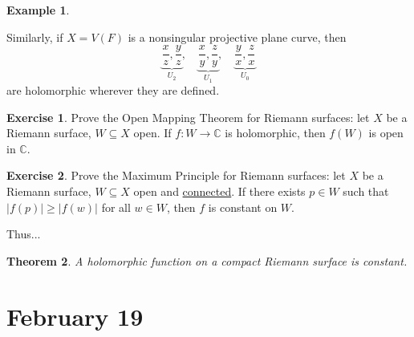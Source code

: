 \documentclass[12pt]{article}
\newcommand{\cx}{\mathbb{C}}
\newtheorem{theorem}{Theorem}[section]
\theoremstyle{definition}
\newtheorem{example}[theorem]{Example}
\newtheorem{exercise}{Exercise}
\theoremstyle{remark}
\begin{document}
\begin{example}
\begin{itemize}
        Similarly, if $X=V(F)$ is a nonsingular projective plane curve, then 
        \begin{equation}
            \underbrace{\frac{x}{z},\frac{y}{z}}_{U_2},\quad\underbrace{\frac{x}{y},\frac{z}{y}}_{U_1},\quad\underbrace{\frac{y}{x},\frac{z}{x}}_{U_0}
        \end{equation}
        are holomorphic wherever they are defined.
    \end{itemize}
\end{example}
\begin{exercise}
    Prove the Open Mapping Theorem for Riemann surfaces: let $X$ be a Riemann surface, $W\subseteq X$ open. If $f:W\to\cx$ is holomorphic, then $f(W)$ is open in $\cx$.
\end{exercise}
\begin{exercise}
    Prove the Maximum Principle for Riemann surfaces: let $X$ be a Riemann surface, $W\subseteq X$ open and \underline{connected}. If there exists $p\in W$ such that $|f(p)|\geq|f(w)|$ for all $w\in W$, then $f$ is constant on $W$.
\end{exercise}
Thus...
\begin{theorem}
    A holomorphic function on a compact Riemann surface is constant.
\end{theorem}
\section{February 19}
\end{document}
